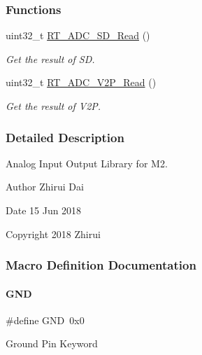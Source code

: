 \subsubsection*{Functions}
\begin{DoxyCompactItemize}
\item 
uint32\+\_\+t \mbox{\hyperlink{a00002_a5532ac461de55576a3875b29300c8536}{R\+T\+\_\+\+A\+D\+C\+\_\+\+S\+D\+\_\+\+Read}} ()
\begin{DoxyCompactList}\small\item\em Get the result of SD. \end{DoxyCompactList}\item 
uint32\+\_\+t \mbox{\hyperlink{a00002_aeb7d0cb0a7849fc5736dae01fe607910}{R\+T\+\_\+\+A\+D\+C\+\_\+\+V2\+P\+\_\+\+Read}} ()
\begin{DoxyCompactList}\small\item\em Get the result of V2P. \end{DoxyCompactList}\end{DoxyCompactItemize}


\subsubsection{Detailed Description}
Analog Input Output Library for M2. 

\begin{DoxyAuthor}{Author}
Zhirui Dai 
\end{DoxyAuthor}
\begin{DoxyDate}{Date}
15 Jun 2018 
\end{DoxyDate}
\begin{DoxyCopyright}{Copyright}
2018 Zhirui 
\end{DoxyCopyright}


\subsubsection{Macro Definition Documentation}
\mbox{\label{a00002_a2c058e9d24bb65c1a6ad2d439b2976ab}} 
\paragraph{\texorpdfstring{G\+ND}{GND}}
{\footnotesize\ttfamily \#define G\+ND~0x0}

Ground Pin Keyword \mbox{\label{a00002_a00318bd4fc3ce7ad4f03124b91891f4f}} 
